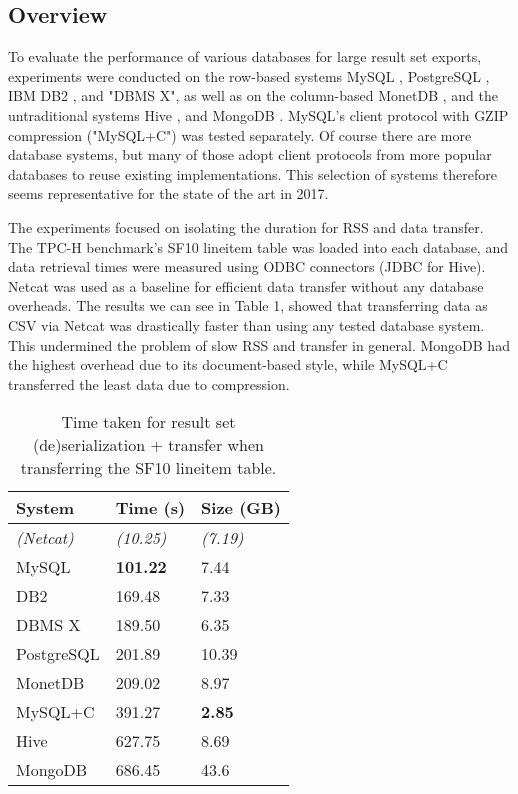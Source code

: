 \documentclass[sigconf]{acmart}
\begin{document}
\subsection{Overview}
To evaluate the performance of various databases for large result set exports, experiments were conducted on the row-based systems MySQL \cite{widenius2002mysql}, PostgreSQL \cite{stonebraker1991postgres}, IBM DB2 \cite{zikopoulos2001db2}, and "DBMS X", as well as on the column-based MonetDB \cite{boncz2008breaking}, and the untraditional systems Hive \cite{thusoo2010hive}, and MongoDB \cite{mongodb2016architecture}. MySQL's client protocol with GZIP compression ("MySQL+C") was tested separately. Of course there are more database systems, but many of those adopt client protocols from more popular databases to reuse existing implementations. This selection of systems therefore seems representative for the state of the art in 2017.

The experiments focused on isolating the duration for RSS and data transfer. The TPC-H benchmark's SF10 lineitem table was loaded into each database, and data retrieval times were measured using ODBC connectors (JDBC for Hive). Netcat \cite{gibson2016ncat} was used as a baseline for efficient data transfer without any database overheads. The results we can see in Table 1, showed that transferring data as CSV via Netcat was drastically faster than using any tested database system. This undermined the problem of slow RSS and transfer in general. MongoDB had the highest overhead due to its document-based style, while MySQL+C transferred the least data due to compression.

\begin{table}[h!]
    \centering
    \caption{Time taken for result set (de)serialization + transfer when transferring the SF10 lineitem table.}
    \begin{tabular}{ p{2cm} | p{2cm}  p{2cm} }
        \textbf{System} & \textbf{Time (s)} & \textbf{Size (GB)} \\ \hline
        \textit{(Netcat)} & \textit{(10.25)} & \textit{(7.19)} \\ \hline
        MySQL & \textbf{101.22} & 7.44 \\ \hline
        DB2 & 169.48 & 7.33 \\ \hline
        DBMS X & 189.50 & 6.35 \\ \hline
        PostgreSQL & 201.89 & 10.39 \\ \hline
        MonetDB & 209.02 & 8.97 \\ \hline
        MySQL+C & 391.27 & \textbf{2.85} \\ \hline
        Hive & 627.75 & 8.69 \\ \hline
        MongoDB & 686.45 & 43.6
    \end{tabular}
\end{table}
\end{document}
